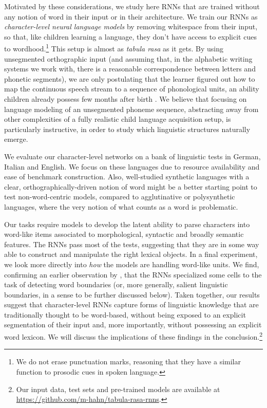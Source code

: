 Motivated by these considerations, we study here RNNs that are trained
without any notion of word in their input or in their
architecture. We train our RNNs as \emph{character-level neural
  language models}
\cite[CNLMs,][]{Mikolov:etal:2011,Sutskever:etal:2011,DBLP:journals/corr/Graves13}
by removing whitespace from their input, so that, like children
learning a language, they don't have access to explicit cues to
wordhood.\footnote{We do not erase punctuation marks, reasoning that
  they have a similar function to prosodic cues in spoken language.}
This setup is almost as \emph{tabula rasa} as it gets. By using
unsegmented orthographic input (and assuming that, in the alphabetic
writing systems we work with, there is a reasonable correspondence
between letters and phonetic segments), we are only postulating that
the learner figured out how to map the continuous speech stream to a
sequence of phonological units, an ability children already possess
few months after birth \cite[e.g.,][]{Maye:etal:2002,Kuhl:2004}. We believe that focusing on language modeling of an unsegmented phoneme sequence, abstracting away from other complexities of a fully realistic child language acquisition setup, is particularly instructive, in order to study which linguistic structures naturally emerge.

We evaluate our character-level networks on a bank of linguistic tests
in German, Italian and English. We focus on these languages due to
resource availability and ease of benchmark construction. Also, well-studied synthetic languages with a clear,
orthographically-driven notion of word might be a better starting point to
test non-word-centric models, compared to agglutinative or
polysynthetic languages, where the very notion of what counts as a
word is problematic. %
  
Our tasks require models to develop the latent
ability to parse characters into word-like items associated to
morphological, syntactic and broadly semantic features. The RNNs
pass most of the tests, suggesting that they are in some way able to
construct and manipulate the right lexical objects. In a final experiment,
we look more directly into \emph{how} the models are handling
word-like units. We find, confirming an earlier observation by
, that the RNNs specialized some
cells to the task of detecting word boundaries (or, more generally,
salient linguistic boundaries, in a sense to be further discussed
below). Taken together, our results suggest that character-level RNNs
capture forms of linguistic knowledge that are traditionally thought to be
word-based, without being exposed to an explicit segmentation of their
 input and, more importantly, without possessing an explicit word
lexicon. We will discuss the implications of these findings in the
conclusion.\footnote{Our input data,
  test sets and pre-trained models are available at \url{https://github.com/m-hahn/tabula-rasa-rnns}.}

